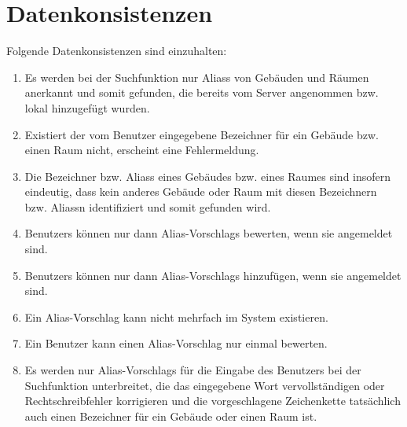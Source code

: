 \section{Datenkonsistenzen}

Folgende Datenkonsistenzen sind einzuhalten:
\begin{enumerate}[label=\textbf{/T\arabic*0/}, align=left, resume]
	\item Es werden bei der Suchfunktion nur \Glspl{Alias} von Gebäuden und Räumen anerkannt und somit gefunden, die bereits vom \Gls{Server} angenommen bzw. \gls{lokal} hinzugefügt wurden.
	\item Existiert der vom \Gls{Benutzer} eingegebene Bezeichner für ein Gebäude bzw. einen Raum nicht, erscheint eine Fehlermeldung.
	\item Die Bezeichner bzw. \Glspl{Alias} eines Gebäudes bzw. eines Raumes sind insofern eindeutig, dass kein anderes Gebäude oder Raum mit diesen Bezeichnern bzw. \Glspl{Alias}n identifiziert und somit gefunden wird.
	\item \Glspl{Benutzer} können nur dann \Glspl{Alias-Vorschlag} bewerten, wenn sie angemeldet sind.
	\item \Glspl{Benutzer} können nur dann \Glspl{Alias-Vorschlag} hinzufügen, wenn sie angemeldet sind.
	\item Ein \Gls{Alias-Vorschlag} kann nicht mehrfach im System existieren.
	\item Ein \Gls{Benutzer} kann einen \Gls{Alias-Vorschlag} nur einmal bewerten.
	\item Es werden nur \Glspl{Alias-Vorschlag} für die Eingabe des \Gls{Benutzer}s bei der Suchfunktion unterbreitet, die das eingegebene Wort vervollständigen oder Rechtschreibfehler korrigieren und die vorgeschlagene Zeichenkette tatsächlich auch einen Bezeichner für ein Gebäude oder einen Raum ist.
\end{enumerate}